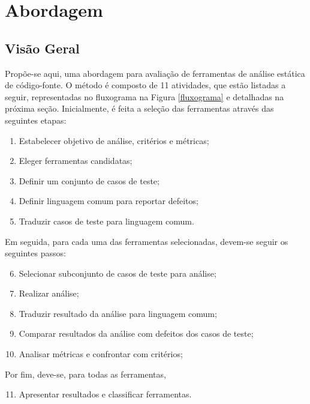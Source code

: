 \chapter{Abordagem}\label{metodologia_proposta}

\section{Visão Geral}\label{metodologia_proposta:visao_geral}

Propõe-se aqui, uma abordagem para avaliação de ferramentas de análise estática de código-fonte. O método é composto de 11 atividades, que estão listadas a seguir, representadas no fluxograma na Figura \ref{fluxograma} e detalhadas na próxima seção. Inicialmente, é feita a seleção das ferramentas através das seguintes etapas:
\begin{enumerate}
  \item Estabelecer objetivo de análise, critérios e métricas;
  \item Eleger ferramentas candidatas;
  \item Definir um conjunto de casos de teste;
  \item Definir linguagem comum para reportar defeitos;
  \item Traduzir casos de teste para linguagem comum.
\end{enumerate}
Em seguida, para cada uma das ferramentas selecionadas, devem-se seguir os seguintes passos:
\begin{enumerate}
    \setcounter{enumi}{5}
  \item Selecionar subconjunto de casos de teste para análise;
  \item Realizar análise;
  \item Traduzir resultado da análise para linguagem comum;
  \item Comparar resultados da análise com defeitos dos casos de  teste;
  \item Analisar métricas e confrontar com critérios;
\end{enumerate}
Por fim, deve-se, para todas as ferramentas,
\begin{enumerate}
    \setcounter{enumi}{10}
  \item Apresentar resultados e classificar ferramentas.
\end{enumerate}

